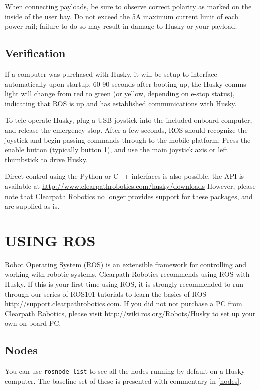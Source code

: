 \documentclass[]{clearpath-latex/clearpath-manual}
\begin{document}
When connecting payloads, be sure to observe correct polarity as marked on the inside of the user bay. 
Do not exceed the 5A maximum current limit of each power rail; failure to do so may result in damage 
to Husky or your payload.

\subsection{Verification}
If a computer was purchased with Husky, it will be setup to interface automatically upon startup. 
60-90 seconds after booting up, the Husky comms light will change from red to green 
(or yellow, depending on e-stop status), indicating that ROS is up and has established communications with Husky.

To tele-operate Husky, plug a USB joystick into the included onboard computer, and release the emergency stop. 
After a few seconds, ROS should recognize the joystick and begin passing commands through to the mobile platform. 
Press the enable button (typically button 1), and use the main joystick axis or left thumbstick to drive Husky.

Direct control using the Python or C++ interfaces is also possible, the API is available at
\url{http://www.clearpathrobotics.com/husky/downloads} However, please note that Clearpath Robotics no 
longer provides support for these packages, and are supplied as is.

\section{USING ROS}
Robot Operating System (ROS) is an extensible framework for controlling and working with robotic systems. 
Clearpath Robotics recommends using ROS with Husky. If this is your first time using ROS, it is strongly 
recommended to run through our series of ROS101 tutorials to learn the basics of ROS 
\url{http://support.clearpathrobotics.com}. If you did not not purchase a PC from Clearpath Robotics, please visit \url{http://wiki.ros.org/Robots/Husky} 
to set up your own on board PC.

\subsection{Nodes}
You can use \lstinline{rosnode list} to see all the nodes running by default on a Husky computer. 
The baseline set of these is presented with commentary in \autoref{nodes}.
\end{document}

